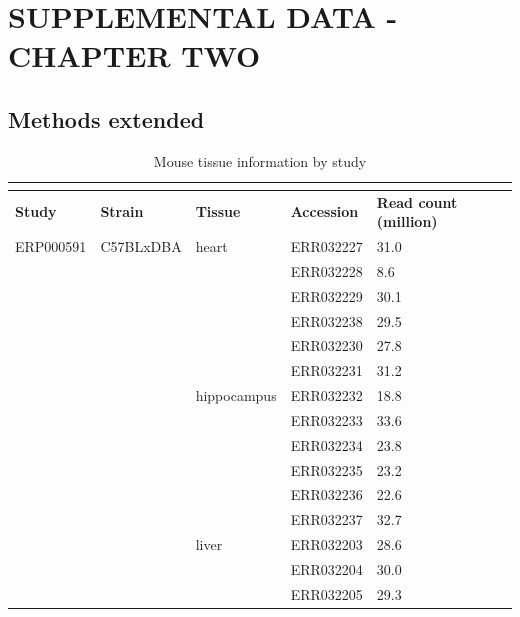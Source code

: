 

\chapter{\uppercase {Supplemental Data - Chapter Two}}

\section{Methods extended}
\begin{longtabu} {X[0.9,c]X[1.1,l]X[1.2,l]X[1,l]X[1,c]}
  \caption{Mouse tissue information by study}\\
  \label{tableB:1}\\
  \toprule
  \textbf{Study} & \textbf{Strain} & \textbf{Tissue} & \textbf{Accession} & \textbf{Read count (million)}\\
  \midrule
  \endhead
  ERP000591 & C57BLxDBA & heart        & ERR032227 & 31.0\\
            &           &              & ERR032228 & 8.6 \\
            &           &              & ERR032229 & 30.1\\
            &           &              & ERR032238 & 29.5\\
            &           &              & ERR032230 & 27.8\\
            &           &              & ERR032231 & 31.2\\
            &           & hippocampus  & ERR032232 & 18.8\\
            &           &              & ERR032233 & 33.6\\
            &           &              & ERR032234 & 23.8\\
            &           &              & ERR032235 & 23.2\\
            &           &              & ERR032236 & 22.6\\
            &           &              & ERR032237 & 32.7\\
            &           & liver        & ERR032203 & 28.6\\
            &           &              & ERR032204 & 30.0\\
            &           &              & ERR032205 & 29.3\\

\end{longtabu}
